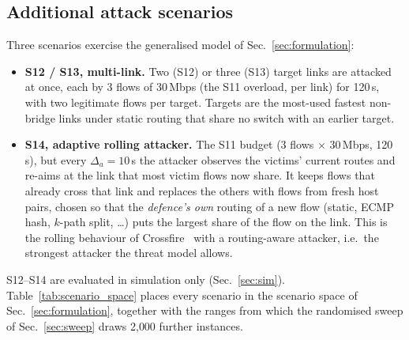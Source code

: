 
\subsection{Additional attack scenarios}\label{sec:scenarios}
Three scenarios exercise the generalised model of Sec.~\ref{sec:formulation}:
\begin{itemize}
\item \textbf{S12 / S13, multi-link.} Two (S12) or three (S13) target links are attacked at
  once, each by 3 flows of 30\,Mbps (the S11 overload, per link) for 120\,s, with two legitimate
  flows per target. Targets are the most-used fastest non-bridge links under static routing that
  share no switch with an earlier target.
\item \textbf{S14, adaptive rolling attacker.} The S11 budget (3 flows $\times$ 30\,Mbps, 120\,s),
  but every $\Delta_a=10$\,s the attacker observes the victims' current routes and re-aims at the
  link that most victim flows now share. It keeps flows that already cross that link and replaces
  the others with flows from fresh host pairs, chosen so that the \emph{defence's own} routing of a
  new flow (static, ECMP hash, $k$-path split, \dots) puts the largest share of the flow on the link.
  This is the rolling behaviour of Crossfire~\cite{kang2013crossfire} with a routing-aware
  attacker, i.e.\ the strongest attacker the threat model allows.
\end{itemize}
S12--S14 are evaluated in simulation only (Sec.~\ref{sec:sim}).
Table~\ref{tab:scenario_space} places every scenario in the scenario space of
Sec.~\ref{sec:formulation}, together with the ranges from which the randomised sweep of
Sec.~\ref{sec:sweep} draws 2{,}000 further instances.



